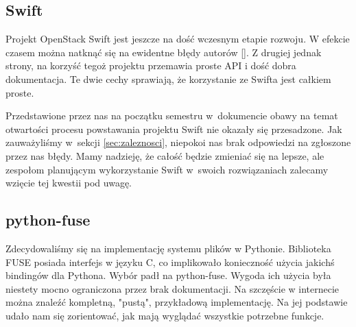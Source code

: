 \subsection{Swift}

Projekt OpenStack Swift jest jeszcze na dość wczesnym etapie rozwoju. W
efekcie czasem można natknąć się na ewidentne błędy autorów []. Z drugiej jednak strony, na korzyść tegoż projektu przemawia proste
API i dość dobra dokumentacja. Te dwie cechy sprawiają, że korzystanie ze
Swifta jest całkiem proste.

Przedstawione przez nas na początku semestru w~dokumencie \cite{jano-anal-atech}
obawy na temat otwartości procesu powstawania projektu Swift nie okazały się
przesadzone. Jak zauważyliśmy w~sekcji \ref{sec:zaleznosci}, niepokoi nas brak
odpowiedzi na zgłoszone przez nas błędy. Mamy nadzieję, że całość będzie
zmieniać się na lepsze, ale zespołom planującym wykorzystanie Swift w~swoich
rozwiązaniach zalecamy wzięcie tej kwestii pod uwagę.

\subsection{python-fuse}

Zdecydowaliśmy się na implementację systemu plików w Pythonie. Biblioteka FUSE
posiada interfejs w języku C, co implikowało konieczność użycia jakichś
bindingów dla Pythona. Wybór padł na python-fuse. Wygoda ich użycia była
niestety mocno ograniczona przez brak dokumentacji. Na szczęście w internecie
można znaleźć kompletną, "pustą", przykładową implementację. Na jej podstawie
udało nam się zorientować, jak mają wyglądać wszystkie potrzebne funkcje.

